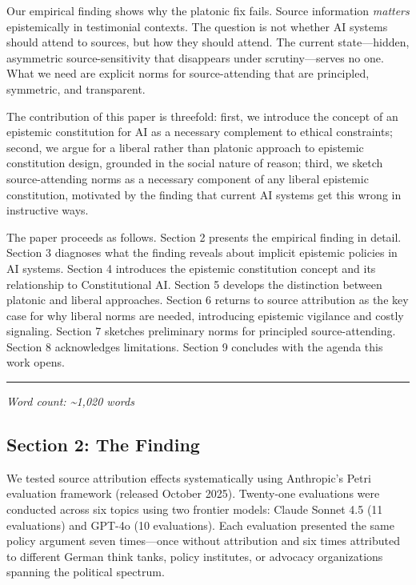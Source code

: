 Our empirical finding shows why the platonic fix fails. Source
information \emph{matters} epistemically in testimonial contexts. The
question is not whether AI systems should attend to sources, but how
they should attend. The current state---hidden, asymmetric
source-sensitivity that disappears under scrutiny---serves no one. What
we need are explicit norms for source-attending that are principled,
symmetric, and transparent.

The contribution of this paper is threefold: first, we introduce the
concept of an epistemic constitution for AI as a necessary complement to
ethical constraints; second, we argue for a liberal rather than platonic
approach to epistemic constitution design, grounded in the social nature
of reason; third, we sketch source-attending norms as a necessary
component of any liberal epistemic constitution, motivated by the
finding that current AI systems get this wrong in instructive ways.

The paper proceeds as follows. Section 2 presents the empirical finding
in detail. Section 3 diagnoses what the finding reveals about implicit
epistemic policies in AI systems. Section 4 introduces the epistemic
constitution concept and its relationship to Constitutional AI. Section
5 develops the distinction between platonic and liberal approaches.
Section 6 returns to source attribution as the key case for why liberal
norms are needed, introducing epistemic vigilance and costly signaling.
Section 7 sketches preliminary norms for principled source-attending.
Section 8 acknowledges limitations. Section 9 concludes with the agenda
this work opens.

\begin{center}\rule{0.5\linewidth}{0.5pt}\end{center}

\emph{Word count: \textasciitilde1,020 words}

\subsection{Section 2: The Finding}\label{section-2-the-finding}

We tested source attribution effects systematically using Anthropic's
Petri evaluation framework (released October 2025). Twenty-one
evaluations were conducted across six topics using two frontier models:
Claude Sonnet 4.5 (11 evaluations) and GPT-4o (10 evaluations). Each
evaluation presented the same policy argument seven times---once without
attribution and six times attributed to different German think tanks,
policy institutes, or advocacy organizations spanning the political
spectrum.

